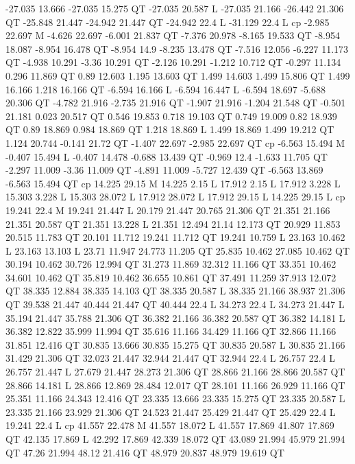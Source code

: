 -27.035 13.666 -27.035 15.275 QT
-27.035 20.587 L
-27.035 21.166 -26.442 21.306 QT
-25.848 21.447 -24.942 21.447 QT
-24.942 22.4 L
-31.129 22.4 L
cp
-2.985 22.697 M
-4.626 22.697 -6.001 21.837 QT
-7.376 20.978 -8.165 19.533 QT
-8.954 18.087 -8.954 16.478 QT
-8.954 14.9 -8.235 13.478 QT
-7.516 12.056 -6.227 11.173 QT
-4.938 10.291 -3.36 10.291 QT
-2.126 10.291 -1.212 10.712 QT
-0.297 11.134 0.296 11.869 QT
0.89 12.603 1.195 13.603 QT
1.499 14.603 1.499 15.806 QT
1.499 16.166 1.218 16.166 QT
-6.594 16.166 L
-6.594 16.447 L
-6.594 18.697 -5.688 20.306 QT
-4.782 21.916 -2.735 21.916 QT
-1.907 21.916 -1.204 21.548 QT
-0.501 21.181 0.023 20.517 QT
0.546 19.853 0.718 19.103 QT
0.749 19.009 0.82 18.939 QT
0.89 18.869 0.984 18.869 QT
1.218 18.869 L
1.499 18.869 1.499 19.212 QT
1.124 20.744 -0.141 21.72 QT
-1.407 22.697 -2.985 22.697 QT
cp
-6.563 15.494 M
-0.407 15.494 L
-0.407 14.478 -0.688 13.439 QT
-0.969 12.4 -1.633 11.705 QT
-2.297 11.009 -3.36 11.009 QT
-4.891 11.009 -5.727 12.439 QT
-6.563 13.869 -6.563 15.494 QT
cp
14.225 29.15 M
14.225 2.15 L
17.912 2.15 L
17.912 3.228 L
15.303 3.228 L
15.303 28.072 L
17.912 28.072 L
17.912 29.15 L
14.225 29.15 L
cp
19.241 22.4 M
19.241 21.447 L
20.179 21.447 20.765 21.306 QT
21.351 21.166 21.351 20.587 QT
21.351 13.228 L
21.351 12.494 21.14 12.173 QT
20.929 11.853 20.515 11.783 QT
20.101 11.712 19.241 11.712 QT
19.241 10.759 L
23.163 10.462 L
23.163 13.103 L
23.71 11.947 24.773 11.205 QT
25.835 10.462 27.085 10.462 QT
30.194 10.462 30.726 12.994 QT
31.273 11.869 32.312 11.166 QT
33.351 10.462 34.601 10.462 QT
35.819 10.462 36.655 10.861 QT
37.491 11.259 37.913 12.072 QT
38.335 12.884 38.335 14.103 QT
38.335 20.587 L
38.335 21.166 38.937 21.306 QT
39.538 21.447 40.444 21.447 QT
40.444 22.4 L
34.273 22.4 L
34.273 21.447 L
35.194 21.447 35.788 21.306 QT
36.382 21.166 36.382 20.587 QT
36.382 14.181 L
36.382 12.822 35.999 11.994 QT
35.616 11.166 34.429 11.166 QT
32.866 11.166 31.851 12.416 QT
30.835 13.666 30.835 15.275 QT
30.835 20.587 L
30.835 21.166 31.429 21.306 QT
32.023 21.447 32.944 21.447 QT
32.944 22.4 L
26.757 22.4 L
26.757 21.447 L
27.679 21.447 28.273 21.306 QT
28.866 21.166 28.866 20.587 QT
28.866 14.181 L
28.866 12.869 28.484 12.017 QT
28.101 11.166 26.929 11.166 QT
25.351 11.166 24.343 12.416 QT
23.335 13.666 23.335 15.275 QT
23.335 20.587 L
23.335 21.166 23.929 21.306 QT
24.523 21.447 25.429 21.447 QT
25.429 22.4 L
19.241 22.4 L
cp
41.557 22.478 M
41.557 18.072 L
41.557 17.869 41.807 17.869 QT
42.135 17.869 L
42.292 17.869 42.339 18.072 QT
43.089 21.994 45.979 21.994 QT
47.26 21.994 48.12 21.416 QT
48.979 20.837 48.979 19.619 QT
